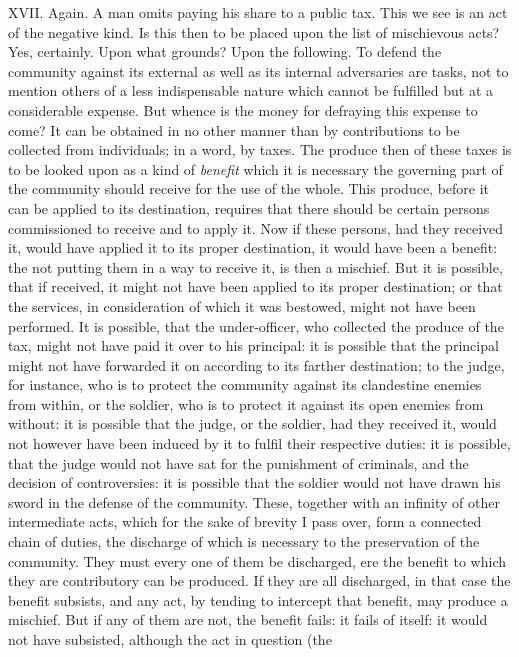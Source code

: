 \documentclass[12pt]{report}
\begin{document}
XVII. Again. A man omits paying his share to a public tax. This we see
is an act of the negative kind. Is this then to be placed upon the list
of mischievous acts? Yes, certainly. Upon what grounds? Upon the
following. To defend the community against its external as well as its
internal adversaries are tasks, not to mention others of a less
indispensable nature which cannot be fulfilled but at a considerable
expense. But whence is the money for defraying this expense to come? It
can be obtained in no other manner than by contributions to be collected
from individuals; in a word, by taxes. The produce then of these taxes
is to be looked upon as a kind of \emph{benefit} which it is necessary
the governing part of the community should receive for the use of the
whole. This produce, before it can be applied to its destination,
requires that there should be certain persons commissioned to receive
and to apply it. Now if these persons, had they received it, would have
applied it to its proper destination, it would have been a benefit: the
not putting them in a way to receive it, is then a mischief. But it is
possible, that if received, it might not have been applied to its proper
destination; or that the services, in consideration of which it was
bestowed, might not have been performed. It is possible, that the
under-officer, who collected the produce of the tax, might not have paid
it over to his principal: it is possible that the principal might not
have forwarded it on according to its farther destination; to the judge,
for instance, who is to protect the community against its clandestine
enemies from within, or the soldier, who is to protect it against its
open enemies from without: it is possible that the judge, or the
soldier, had they received it, would not however have been induced by it
to fulfil their respective duties: it is possible, that the judge would
not have sat for the punishment of criminals, and the decision of
controversies: it is possible that the soldier would not have drawn his
sword in the defense of the community. These, together with an infinity
of other intermediate acts, which for the sake of brevity I pass over,
form a connected chain of duties, the discharge of which is necessary to
the preservation of the community. They must every one of them be
discharged, ere the benefit to which they are contributory can be
produced. If they are all discharged, in that case the benefit subsists,
and any act, by tending to intercept that benefit, may produce a
mischief. But if any of them are not, the benefit fails: it fails of
itself: it would not have subsisted, although the act in question (the
\end{document}
